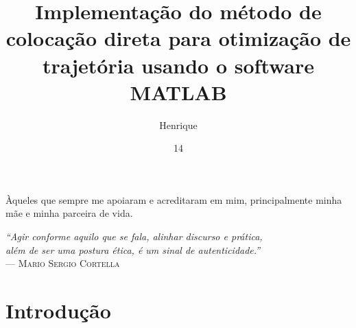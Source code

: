 \documentclass[a4paper, tg]{ita}    %
\author{Henrique}{Silva Simplicio}
\title{Implementação do método de colocação direta para otimização de trajetória usando o software MATLAB}
\date{14}{novembro}{2024}
\begin{document}
\maketitle

\begin{itadedication}
Àqueles que sempre me apoiaram e acreditaram em mim, principalmente minha mãe e minha parceira de vida.
\end{itadedication}

\begin{itathanks}

\end{itathanks}

\thispagestyle{empty}
\ifhyperref{}\fi
\begin{flushright}
\begin{spacing}{1}
\mbox{}\vfill
{\sffamily\itshape
``Agir conforme aquilo que se fala, alinhar discurso e prática,\\
além de ser uma postura ética, é um sinal de autenticidade.''\\}
--- \textsc{Mario Sergio Cortella}
\end{spacing}
\end{flushright}

\begin{abstract}
\noindent

\end{abstract}

\begin{englishabstract}
\noindent

\end{englishabstract}

\listoffigures %


\listoflistings

\listofabbreviations


\tableofcontents

\mainmatter

\chapter{Introdução}
\label{cap:introdução}

\end{document}
